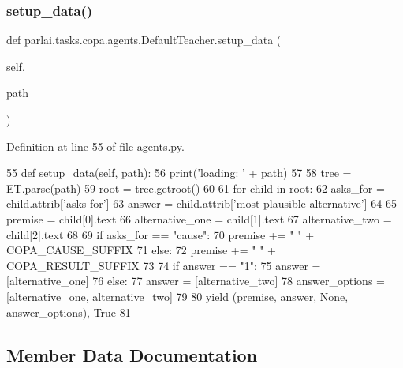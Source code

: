 \subsubsection{\texorpdfstring{setup\+\_\+data()}{setup\_data()}}
{\footnotesize\ttfamily def parlai.\+tasks.\+copa.\+agents.\+Default\+Teacher.\+setup\+\_\+data (\begin{DoxyParamCaption}\item[{}]{self,  }\item[{}]{path }\end{DoxyParamCaption})}



Definition at line 55 of file agents.\+py.


\begin{DoxyCode}
55     \textcolor{keyword}{def }\hyperlink{namespaceparlai_1_1tasks_1_1multinli_1_1agents_a4fa2cb0ba1ed745336ad8bceed36b841}{setup\_data}(self, path):
56         print(\textcolor{stringliteral}{'loading: '} + path)
57 
58         tree = ET.parse(path)
59         root = tree.getroot()
60 
61         \textcolor{keywordflow}{for} child \textcolor{keywordflow}{in} root:
62             asks\_for = child.attrib[\textcolor{stringliteral}{'asks-for'}]
63             answer = child.attrib[\textcolor{stringliteral}{'most-plausible-alternative'}]
64 
65             premise = child[0].text
66             alternative\_one = child[1].text
67             alternative\_two = child[2].text
68 
69             \textcolor{keywordflow}{if} asks\_for == \textcolor{stringliteral}{"cause"}:
70                 premise += \textcolor{stringliteral}{" "} + COPA\_CAUSE\_SUFFIX
71             \textcolor{keywordflow}{else}:
72                 premise += \textcolor{stringliteral}{" "} + COPA\_RESULT\_SUFFIX
73 
74             \textcolor{keywordflow}{if} answer == \textcolor{stringliteral}{"1"}:
75                 answer = [alternative\_one]
76             \textcolor{keywordflow}{else}:
77                 answer = [alternative\_two]
78             answer\_options = [alternative\_one, alternative\_two]
79 
80             \textcolor{keywordflow}{yield} (premise, answer, \textcolor{keywordtype}{None}, answer\_options), \textcolor{keyword}{True}
81 \end{DoxyCode}


\subsection{Member Data Documentation}
\mbox{\label{classparlai_1_1tasks_1_1copa_1_1agents_1_1DefaultTeacher_aa8f1b5e4b4493e80ed37fd6cb5d3b696}} 
